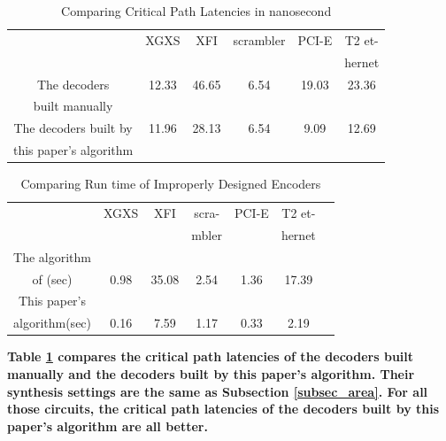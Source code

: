 \documentclass[journal]{IEEEtran}
\begin{document}
\begin{table}[b]
\centering
\caption{Comparing Critical Path Latencies in nanosecond}
\begin{tabular}{|c|c|c|c|c|c|}
\hline
                   &XGXS        &XFI       &scrambler    &PCI-E   &T2 et-\\
&&&&&hernet\\ \hline
The decoders       &12.33       &46.65     &6.54         &19.03  &23.36          \\
built manually           &&&&&\\ \hline
The decoders built by      &11.96       &28.13     &6.54         &9.09   &12.69          \\
this paper's algorithm   &&&&&\\ \hline
\end{tabular}\label{tab_cmptiming}
\end{table}

\begin{table}[t]
\centering
\caption{Comparing Run time of Improperly Designed Encoders}
\begin{tabular}{|c|c|c|c|c|c|c|}
\hline
                                        &XGXS     &XFI       &scra-     &PCI-E    &T2 et-\\
                                        &         &          &mbler     &        &hernet\\ \hline
The algorithm      &&&&&\\
of \cite{ShengYuShen:fmcad10}(sec)     &0.98     &35.08     &2.54      &1.36    &17.39\\\hline
This paper's                         &&&&&\\
algorithm(sec)                           &0.16     &7.59     &1.17      &0.33    &2.19\\\hline
\end{tabular}\label{tab_impdes}
\end{table}


\textbf{Table \ref{tab_cmptiming} compares the critical path latencies of the decoders built manually
and the decoders built by this paper's algorithm.
Their synthesis settings are the same as Subsection \ref{subsec_area}.
For all those circuits,
the critical path latencies of the decoders built by this paper's algorithm are all better.}

%
\end{document}
